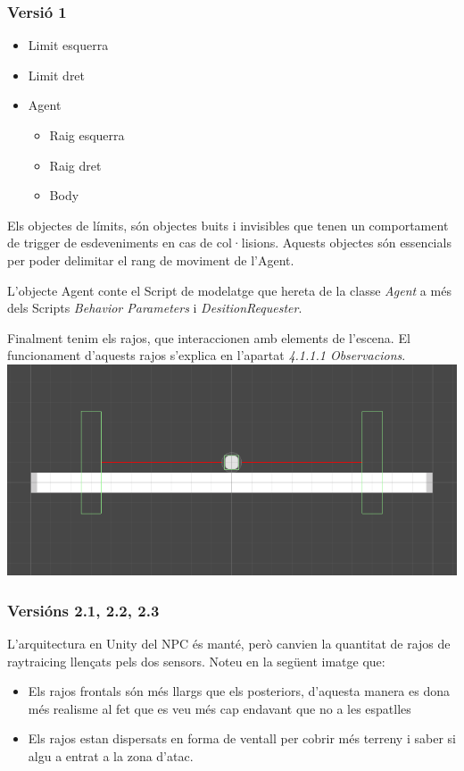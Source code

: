 \documentclass{article}
\begin{document}
    \subsubsection{Versió 1}
    
    \begin{itemize}
        \item Limit esquerra
        \item Limit dret
        \item Agent
        \begin{itemize}
            \item Raig esquerra
            \item Raig dret
            \item Body
        \end{itemize}
    \end{itemize}

    Els objectes de límits, són objectes buits i invisibles que tenen un comportament de trigger de esdeveniments en cas de col·lisions. Aquests objectes són essencials per poder delimitar el rang de moviment de l'Agent.

    L'objecte Agent conte el Script de modelatge que hereta de la classe \textit{Agent} a més dels Scripts \textit{Behavior Parameters} i \textit{DesitionRequester}.
    
    Finalment tenim els rajos, que interaccionen amb elements de l'escena. El funcionament d'aquests rajos s'explica en l'apartat \textit{4.1.1.1 Observacions}. \\
    
    \includegraphics[width=\textwidth]{images/NPC_scene.png} 
    
    \subsubsection{Versións 2.1, 2.2, 2.3}
    L'arquitectura en Unity del NPC és manté, però canvien la quantitat de rajos de raytraicing llençats pels dos sensors. Noteu en la següent imatge que:
    \begin{itemize}
    \item Els rajos frontals són més llargs que els posteriors, d'aquesta manera es dona més realisme al fet que es veu més cap endavant que no a les espatlles
    \item Els rajos estan dispersats en forma de ventall per cobrir més terreny i saber si algu a entrat a la zona d'atac.
    \end{itemize}
\end{document}

